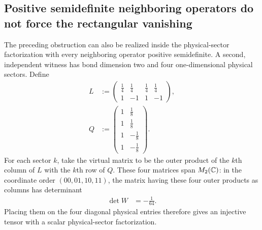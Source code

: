 \documentclass{article}
\begin{document}
\subsection{Positive semidefinite neighboring operators do not force the rectangular vanishing}
\label{sec:cpgsv17_psd_neighboring_obstruction}

The preceding obstruction can also be realized inside the physical-sector
factorization with every neighboring operator positive semidefinite. A second,
independent witness has bond dimension two and four one-dimensional physical
sectors. Define
\begin{align}
    L
        &:=
        \begin{pmatrix}
            \frac14&\frac14&\frac14&\frac14\\
            1&-1&1&-1
        \end{pmatrix},
    \label{eq:cpgsv17_psd_witness_left_matrix}\\
    Q
        &:=
        \begin{pmatrix}
            1&\frac18\\
            1&\frac18\\
            1&-\frac18\\
            1&-\frac18
        \end{pmatrix}.
    \label{eq:cpgsv17_psd_witness_right_matrix}
\end{align}
For each sector $k$, take the virtual matrix to be the outer product of the
$k$th column of $L$ with the $k$th row of $Q$. These four matrices span
$M_{2}(\mathbb{C})$: in the coordinate order $(00,01,10,11)$, the matrix having these
four outer products as columns has determinant
\begin{align}
    \det W
        &= -\frac{1}{64}.
    \label{eq:cpgsv17_psd_witness_spanning_determinant}
\end{align}
Placing them on the four diagonal physical entries therefore gives an
injective tensor with a scalar physical-sector factorization.
\end{document}
